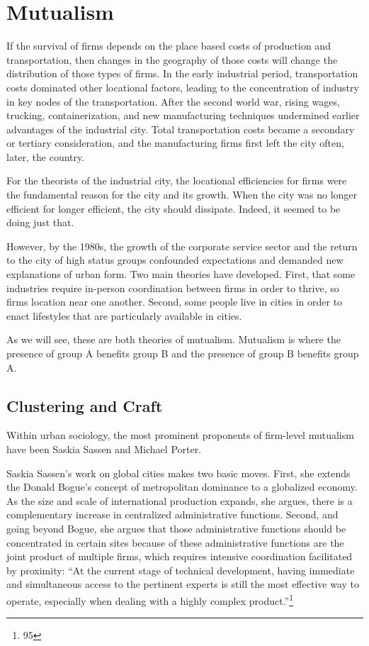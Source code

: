 \section*{Mutualism}
If the survival of firms depends on the place based costs of
production and transportation, then changes in the geography of those
costs will change the distribution of those types of firms. In the
early industrial period, transportation costs dominated other
locational factors, leading to the concentration of industry in key
nodes of the transportation. After the second world war, rising wages,
trucking, containerization, and new manufacturing techniques
undermined earlier advantages of the industrial city. Total
transportation costs became a secondary or tertiary consideration, and
the manufacturing firms first left the city often, later, the country.

For the theorists of the industrial city, the locational efficiencies
for firms were the fundamental reason for the city and its
growth. When the city was no longer efficient for longer efficient,
the city should dissipate. Indeed, it seemed to be doing just that. 

However, by the 1980s, the growth of the corporate service sector and
the return to the city of high status groups confounded expectations
and demanded new explanations of urban form. Two main theories have
developed. First, that some industries require in-person coordination
between firms in order to thrive, so firms location near one
another. Second, some people live in cities in order to enact
lifestyles that are particularly available in cities. 

As we will see, these are both theories of mutualism. Mutualism is
where the presence of group A benefits group B and the presence of
group B benefits group A. 

\subsection*{Clustering and Craft}
Within urban sociology, the most prominent proponents of firm-level
mutualism have been Saskia Sassen and Michael Porter.

Saskia Sassen's work on global cities makes two basic moves. First,
she extends the Donald Bogue's concept of metropolitan dominance to a
globalized economy. As the size and scale of international production
expands, she argues, there is a complementary increase in centralized
administrative functions. Second, and going beyond Bogue, she argues
that those administrative functions should be concentrated in certain
sites because of these administrative functions are the joint product
of multiple firms, which requires intensive coordination facilitated
by proximity: ``At the current stage of technical development, having
immediate and simultaneous access to the pertinent experts is still
the most effective way to operate, especially when dealing with a
highly complex product.''\footnote{95}

